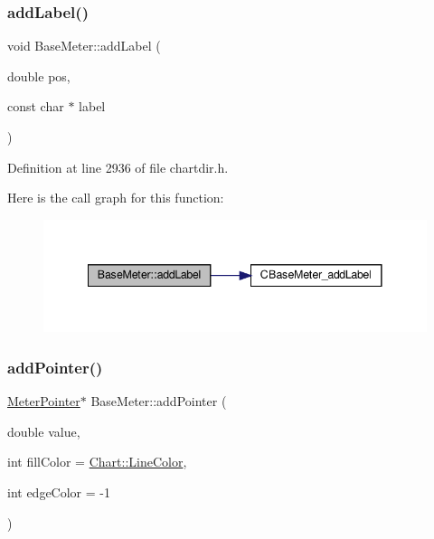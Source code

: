 \subsubsection{\texorpdfstring{add\+Label()}{addLabel()}}
{\footnotesize\ttfamily void Base\+Meter\+::add\+Label (\begin{DoxyParamCaption}\item[{double}]{pos,  }\item[{const char $\ast$}]{label }\end{DoxyParamCaption})\hspace{0.3cm}{\ttfamily [inline]}}



Definition at line 2936 of file chartdir.\+h.

Here is the call graph for this function\+:
\nopagebreak
\begin{figure}[H]
\begin{center}
\leavevmode
\includegraphics[width=341pt]{class_base_meter_ac1509c1c45fab0484842553f81c97365_cgraph}
\end{center}
\end{figure}
\mbox{\label{class_base_meter_afa1ed46d9fd3dfc852d170338929795f}} 
\subsubsection{\texorpdfstring{add\+Pointer()}{addPointer()}}
{\footnotesize\ttfamily \hyperlink{class_meter_pointer}{Meter\+Pointer}$\ast$ Base\+Meter\+::add\+Pointer (\begin{DoxyParamCaption}\item[{double}]{value,  }\item[{int}]{fill\+Color = {\ttfamily \hyperlink{namespace_chart_abee0d882fdc9ad0b001245ad9fc64011a04817a359476e87a5c572a7a69cdaaec}{Chart\+::\+Line\+Color}},  }\item[{int}]{edge\+Color = {\ttfamily -\/1} }\end{DoxyParamCaption})\hspace{0.3cm}{\ttfamily [inline]}}



